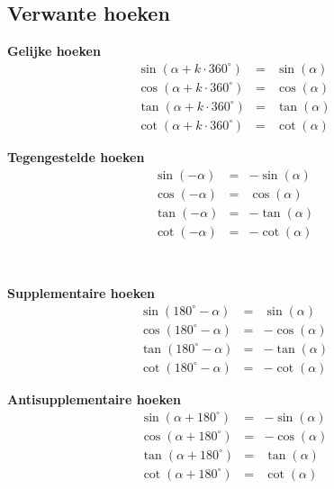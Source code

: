 \documentclass[a4paper,12pt]{article}
\begin{document}
\subsection{Verwante hoeken}
\vspace{0.2cm}
\begin{minipage}[b]{0.5\linewidth}
\textbf{Gelijke hoeken}
\begin{eqnarray*}
\sin(\alpha + k\cdot 360^\circ) &=& \sin(\alpha)\\
\cos(\alpha + k\cdot 360^\circ) &=& \cos(\alpha)\\
\tan(\alpha + k\cdot 360^\circ) &=& \tan(\alpha)\\
\cot(\alpha + k\cdot 360^\circ) &=& \cot(\alpha)
\end{eqnarray*}
\end{minipage}
\hspace{0.5cm}
\begin{minipage}[b]{0.5\linewidth}
\textbf{Tegengestelde hoeken}
\begin{eqnarray*}
\sin(-\alpha) &=& -\sin(\alpha)\\
\cos(-\alpha) &=& \cos(\alpha)\\
\tan(-\alpha) &=& -\tan(\alpha)\\
\cot(-\alpha) &=& -\cot(\alpha)
\end{eqnarray*}
\end{minipage}
\ \\
\begin{minipage}[b]{0.5\linewidth}
\textbf{Supplementaire hoeken}
\begin{eqnarray*}
\sin(180^\circ-\alpha) &=& \sin(\alpha)\\
\cos(180^\circ-\alpha) &=& -\cos(\alpha)\\
\tan(180^\circ-\alpha) &=& -\tan(\alpha)\\
\cot(180^\circ-\alpha) &=& -\cot(\alpha)
\end{eqnarray*}
\end{minipage}
\hspace{0.5cm}
\begin{minipage}[b]{0.5\linewidth}
\textbf{Antisupplementaire hoeken}
\begin{eqnarray*}
\sin(\alpha+180^\circ) &=& -\sin(\alpha)\\
\cos(\alpha+180^\circ) &=& -\cos(\alpha)\\
\tan(\alpha+180^\circ) &=& \tan(\alpha)\\
\cot(\alpha+180^\circ) &=& \cot(\alpha)
\end{eqnarray*}
\end{minipage}
\end{document}
